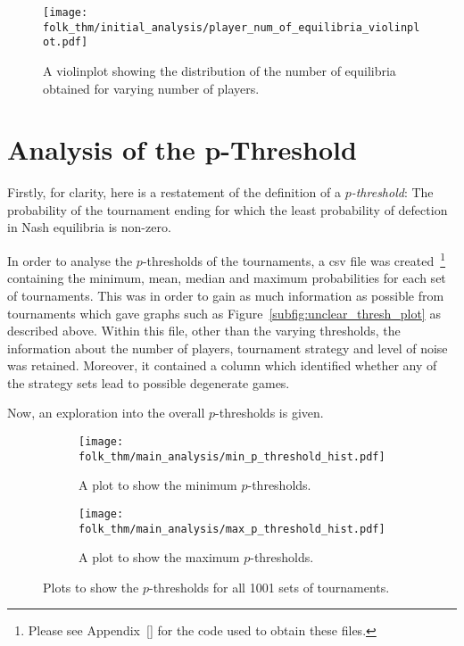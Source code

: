 \begin{figure}      
    \centering
    \texttt{[image: folk\_thm/initial\_analysis/player\_num\_of\_equilibria\_violinplot.pdf]}
    \caption{A violinplot showing the distribution of the number of equilibria obtained for varying number of players.}\label{fig:NE_violinplot}
\end{figure}



\section{Analysis of the p-Threshold}\label{sec:Analysis_of_the_p-Threshold}

Firstly, for clarity, here is a restatement of the definition of a
\textit{\(p\)-threshold}: The probability of the tournament ending for which the
least probability of defection in Nash equilibria is non-zero.

In order to analyse the \(p\)-thresholds of the tournaments, a csv file was created~\footnote{Please see Appendix~\ref{} %
for the code used to obtain these files.} containing the
minimum, mean, median and maximum probabilities for each set of tournaments.
This was in order to gain as much information as possible from tournaments which
gave graphs such as Figure~\ref{subfig:unclear_thresh_plot} as described above. 
Within this file, other than the varying thresholds, the
information about the number of players, tournament strategy and level of
noise was retained. Moreover, it contained a column which identified whether any
of the strategy sets lead to possible degenerate games.

Now, an exploration into the overall \(p\)-thresholds is given.

\begin{figure}
    \begin{subfigure}{0.45\textwidth}
        \centering
        \texttt{[image: folk\_thm/main\_analysis/min\_p\_threshold\_hist.pdf]}
        \caption{A plot to show the minimum \(p\)-thresholds.}\label{subfig:min_p_thresh}
    \end{subfigure}
    \begin{subfigure}{0.45\textwidth}
        \centering
        \texttt{[image: folk\_thm/main\_analysis/max\_p\_threshold\_hist.pdf]}
        \caption{A plot to show the maximum \(p\)-thresholds.}\label{subfig:max_p_thresh}
    \end{subfigure}
    \caption{Plots to show the \(p\)-thresholds for all 1001 sets of tournaments.}\label{fig:min_max_p_thresh}
\end{figure}

